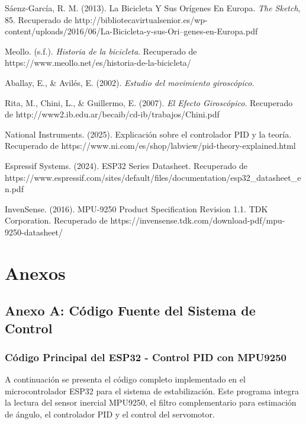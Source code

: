 \documentclass[12pt,letterpaper]{report}
\begin{document}
Sáenz-García, R. M. (2013). La Bicicleta Y Sus Orígenes En Europa. \textit{The Sketch}, 85. Recuperado de http://bibliotecavirtualsenior.es/wp-content/uploads/2016/06/La-Bicicleta-y-sus-Ori--genes-en-Europa.pdf

Meollo. (s.f.). \textit{Historia de la bicicleta}. Recuperado de https://www.meollo.net/es/historia-de-la-bicicleta/

Aballay, E., \& Avilés, E. (2002). \textit{Estudio del movimiento giroscópico}.

Rita, M., Chini, L., \& Guillermo, E. (2007). \textit{El Efecto Giroscópico}. Recuperado de http://www2.ib.edu.ar/becaib/cd-ib/trabajos/Chini.pdf

National Instruments. (2025). Explicación sobre el controlador PID y la teoría. Recuperado de https://www.ni.com/es/shop/labview/pid-theory-explained.html

Espressif Systems. (2024). ESP32 Series Datasheet. Recuperado de https://www.espressif.com/sites/default/files/documentation/esp32\_datasheet\_en.pdf

InvenSense. (2016). MPU-9250 Product Specification Revision 1.1. TDK Corporation. Recuperado de https://invensense.tdk.com/download-pdf/mpu-9250-datasheet/

\chapter{Anexos}

\section{Anexo A: Código Fuente del Sistema de Control}

\subsection*{Código Principal del ESP32 - Control PID con MPU9250}

A continuación se presenta el código completo implementado en el microcontrolador ESP32 para el sistema de estabilización. Este programa integra la lectura del sensor inercial MPU9250, el filtro complementario para estimación de ángulo, el controlador PID y el control del servomotor.
\end{document}
